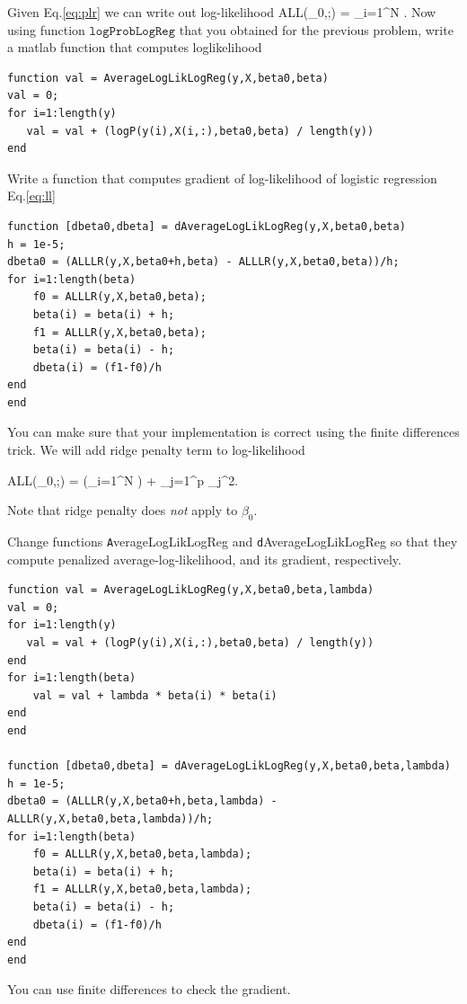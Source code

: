 \documentclass{article}
\begin{document}
\newproblem{0.5pt}
Given Eq.\eqref{eq:plr} we can write out log-likelihood
\BEQ \label{eq:ll}
\textrm{ALL}(\beta_0,\beta;) = \sum_{i=1}^N \log {}.
\EEQ
Now using function $\texttt{logProbLogReg}$ that you obtained for the previous problem, write a matlab function that computes loglikelihood
\begin{verbatim}
function val = AverageLogLikLogReg(y,X,beta0,beta)
val = 0;
for i=1:length(y)
   val = val + (logP(y(i),X(i,:),beta0,beta) / length(y))
end
\end{verbatim}


\newproblem{0.5pt}
Write a function that computes gradient of log-likelihood of logistic regression Eq.\eqref{eq:ll}
\begin{verbatim}
function [dbeta0,dbeta] = dAverageLogLikLogReg(y,X,beta0,beta)
h = 1e-5;
dbeta0 = (ALLLR(y,X,beta0+h,beta) - ALLLR(y,X,beta0,beta))/h;
for i=1:length(beta)
    f0 = ALLLR(y,X,beta0,beta);
    beta(i) = beta(i) + h;
    f1 = ALLLR(y,X,beta0,beta);
    beta(i) = beta(i) - h;
	dbeta(i) = (f1-f0)/h
end
end
\end{verbatim}
You can make sure that your implementation is correct using the finite differences trick.
\newproblem{0.5pt}
We will add ridge penalty term to log-likelihood

\BEQ \label{eq:pll}
\textrm{ALL}(\beta_0,\beta;) = \left(\sum_{i=1}^N \log {}\right) + \lambda\sum_{j=1}^p \beta_j^2.
\EEQ

Note that ridge penalty does {\em not} apply to $\beta_0$.

Change functions {\texttt AverageLogLikLogReg} and {\texttt dAverageLogLikLogReg} so that they compute penalized average-log-likelihood, and its gradient, respectively.

\begin{verbatim}
function val = AverageLogLikLogReg(y,X,beta0,beta,lambda)
val = 0;
for i=1:length(y)
   val = val + (logP(y(i),X(i,:),beta0,beta) / length(y))
end
for i=1:length(beta)
    val = val + lambda * beta(i) * beta(i)
end
end

function [dbeta0,dbeta] = dAverageLogLikLogReg(y,X,beta0,beta,lambda)
h = 1e-5;
dbeta0 = (ALLLR(y,X,beta0+h,beta,lambda) - ALLLR(y,X,beta0,beta,lambda))/h;
for i=1:length(beta)
    f0 = ALLLR(y,X,beta0,beta,lambda);
    beta(i) = beta(i) + h;
    f1 = ALLLR(y,X,beta0,beta,lambda);
    beta(i) = beta(i) - h;
	dbeta(i) = (f1-f0)/h
end
end
\end{verbatim}
You can use finite differences to check the gradient.
\end{document}

